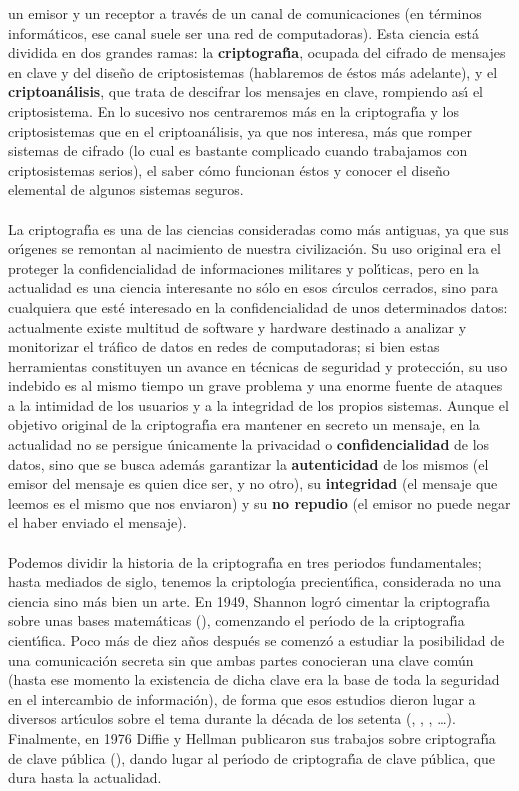 un emisor y un receptor a trav\'es de un canal de comunicaciones (en
t\'erminos inform\'aticos, ese canal suele ser una red de computadoras).
Esta ciencia est\'a dividida en dos grandes ramas: la {\bf criptograf\'{\i}a},
ocupada del cifrado de mensajes en clave y del dise\~no de criptosistemas
(hablaremos de \'estos m\'as adelante), y el {\bf criptoan\'alisis},
que trata de descifrar los mensajes en clave, rompiendo as\'{\i} el 
criptosistema. En lo sucesivo nos centraremos m\'as en la criptograf\'{\i}a y 
los criptosistemas que en el criptoan\'alisis, ya que nos interesa, m\'as que 
romper sistemas de cifrado 
(lo cual es bastante complicado cuando trabajamos con criptosistemas serios), 
el saber c\'omo funcionan \'estos y conocer el dise\~no elemental de algunos 
sistemas seguros.\\
\\La criptograf\'{\i}a es una de las ciencias consideradas como m\'as
antiguas, ya que sus or\'{\i}genes se remontan al nacimiento de nuestra
civilizaci\'on. Su uso original era el proteger la confidencialidad
de informaciones militares y pol\'{\i}ticas, pero en la actualidad es una 
ciencia interesante no s\'olo en esos c\'{\i}rculos cerrados, sino para
cualquiera 
que est\'e interesado en la confidencialidad de unos determinados datos: 
actualmente existe multitud de software y hardware destinado a analizar y 
monitorizar el tr\'afico de datos en redes de computadoras; si bien estas 
herramientas constituyen un avance en t\'ecnicas de seguridad y protecci\'on,
su uso indebido es al mismo tiempo un grave problema y una enorme fuente
de ataques a la intimidad de los usuarios y a la integridad de los propios 
sistemas. Aunque el objetivo original de la criptograf\'{\i}a era mantener en 
secreto un mensaje, en la actualidad no se persigue \'unicamente la privacidad 
o {\bf confidencialidad} de los datos, sino que se busca adem\'as garantizar la 
{\bf autenticidad} de los mismos (el emisor del mensaje es quien dice ser, y 
no otro), su {\bf integridad} (el mensaje que leemos es el mismo que nos 
enviaron) y su {\bf no repudio} (el emisor no puede negar el haber enviado el 
mensaje).\\
\\Podemos dividir la historia de la criptograf\'{\i}a en tres periodos
fundamentales; hasta mediados de siglo, tenemos la criptolog\'{\i}a 
precient\'{\i}fica, considerada no una ciencia sino m\'as bien un arte. En 
1949, Shannon logr\'o cimentar la criptograf\'{\i}a sobre unas bases 
matem\'aticas (\cite{kn:sha49}), comenzando el per\'{\i}odo de la 
criptograf\'{\i}a cient\'{\i}fica. Poco m\'as de diez a\~nos despu\'es se
comenz\'o a estudiar la posibilidad de una comunicaci\'on secreta sin que ambas
partes conocieran una clave com\'un (hasta ese momento la existencia de dicha
clave era la base de toda la seguridad en el intercambio de informaci\'on),
de forma que esos estudios dieron lugar a diversos art\'{\i}culos sobre el tema 
durante la d\'ecada de los setenta (\cite{kn:ell70}, \cite{kn:coc73}, 
\cite{kn:wil74}, \cite{kn:wil76}\ldots). Finalmente, en 1976 Diffie y Hellman 
publicaron sus trabajos sobre criptograf\'{\i}a de clave p\'ublica 
(\cite{kn:dh76}), dando lugar al per\'{\i}odo de criptograf\'{\i}a de clave 
p\'ublica, que dura hasta la actualidad.
